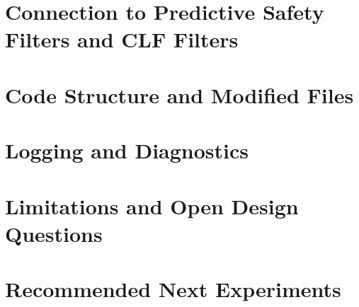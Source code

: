 \documentclass[11pt]{article}
\begin{document}
\section{Connection to Predictive Safety Filters and CLF Filters}

\section{Code Structure and Modified Files}

\section{Logging and Diagnostics}

\section{Limitations and Open Design Questions}

\section{Recommended Next Experiments}
\end{document}
